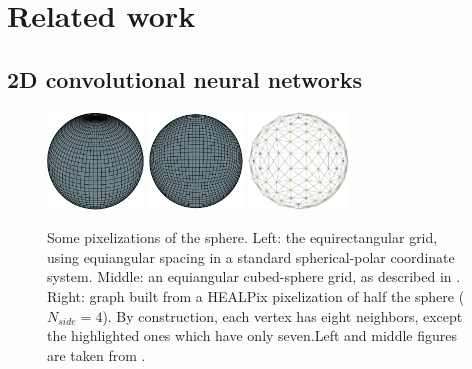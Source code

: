 \documentclass[final,twocolumn,3p,times,sort&compress]{elsarticle}
\newcommand{\1}{\b{1}}              %
\newcommand{\0}{\b{0}}              %
\begin{document}
\section{Related work}
\label{sec:related_work}

\subsection{2D convolutional neural networks}

\begin{figure}[t!]
    \centering
    \includegraphics[height=7em]{sphere_grid_equirectangular}
    \hfill
    \includegraphics[height=7em]{sphere_grid_cubedsphere}
    \hfill
    \includegraphics[height=7em]{half_graph_4}
    \caption[]{Some pixelizations of the sphere. Left: the equirectangular grid, using equiangular spacing in a standard spherical-polar coordinate system. Middle: an equiangular cubed-sphere grid, as described in \citep{ronchi1996cubed}. Right: graph built from a HEALPix pixelization of half the sphere ($N_{side} = 4$). By construction, each vertex has eight neighbors, except the highlighted ones which have only seven.\footnotemark[5] Left and middle figures are taken from \citep{boomsma2017spherical}.}
    \label{fig:sphere_grids}
    \label{fig:healpix_graph_4}
\end{figure}
\end{document}
